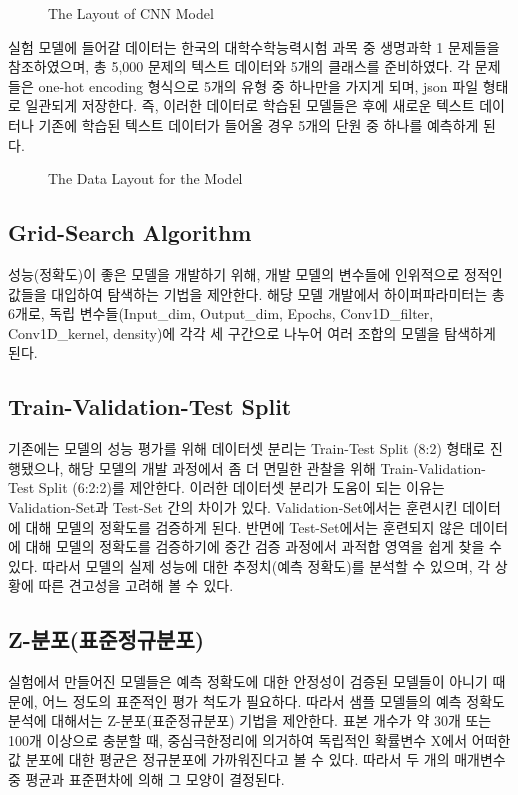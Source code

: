 \documentclass{jcse}
\begin{document}
\begin{figure}[ht]
	\centering
	\caption{The Layout of CNN Model}
	\label{fig:layout}
\end{figure}

실험 모델에 들어갈 데이터는 한국의 대학수학능력시험 과목 중 생명과학 1 문제들을 참조하였으며, 총 5,000 문제의 텍스트 데이터와 5개의 클래스를 준비하였다. 각 문제들은 one-hot encoding 형식으로 5개의 유형 중 하나만을 가지게 되며, json 파일 형태로 일관되게 저장한다. 즉, 이러한 데이터로 학습된 모델들은 후에 새로운 텍스트 데이터나 기존에 학습된 텍스트 데이터가 들어올 경우 5개의 단원 중 하나를 예측하게 된다.

\begin{figure}[ht]
	\centering
	\caption{The Data Layout for the Model}
	\label{fig:dataLayout}
\end{figure}

\subsection{Grid-Search Algorithm}
성능(정확도)이 좋은 모델을 개발하기 위해, 개발 모델의 변수들에 인위적으로 정적인 값들을 대입하여 탐색하는 기법\cite{cite:grid}을 제안한다.
해당 모델 개발에서 하이퍼파라미터는 총 6개로, 독립 변수들(Input\_dim, Output\_dim, Epochs, Conv1D\_filter, Conv1D\_kernel, density)에 각각 세 구간으로 나누어 여러 조합의 모델을 탐색하게 된다.

\subsection{Train-Validation-Test Split}
기존에는 모델의 성능 평가를 위해 데이터셋 분리는 Train-Test Split (8:2) 형태\cite{cite:split}로 진행됐으나, 해당 모델의 개발 과정에서 좀 더 면밀한 관찰을 위해 Train-Validation-Test Split (6:2:2)를 제안한다.
이러한 데이터셋 분리가 도움이 되는 이유는 Validation-Set과 Test-Set 간의 차이가 있다. Validation-Set에서는 훈련시킨 데이터에 대해 모델의 정확도를 검증하게 된다. 반면에 Test-Set에서는 훈련되지 않은 데이터에 대해 모델의 정확도를 검증하기에 중간 검증 과정에서 과적합 영역\cite{cite:SplittingData}을 쉽게 찾을 수 있다. 따라서 모델의 실제 성능에 대한 추정치(예측 정확도)를 분석할 수 있으며, 각 상황에 따른 견고성을 고려해 볼 수 있다.

\subsection{Z-분포(표준정규분포)}
실험에서 만들어진 모델들은 예측 정확도에 대한 안정성이 검증된 모델들이 아니기 때문에, 어느 정도의 표준적인 평가 척도가 필요하다. 따라서 샘플 모델들의 예측 정확도 분석에 대해서는 Z-분포(표준정규분포) 기법을 제안한다.
표본 개수가 약 30개 또는 100개 이상으로 충분할 때, 중심극한정리\cite{cite:CentralLimit}에 의거하여 독립적인 확률변수 X\cite{cite:Probability}에서 어떠한 값 분포에 대한 평균은 정규분포에 가까워진다고 볼 수 있다. 따라서 두 개의 매개변수 중 평균과 표준편차에 의해 그 모양이 결정된다.
\end{document}
